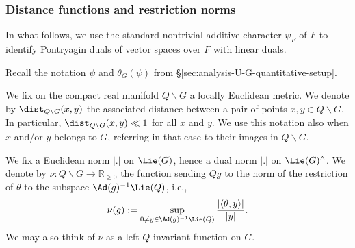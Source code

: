 \subsubsection{Distance functions and restriction norms}\label{sec:dist-funct-restr}
In what follows, we use the standard nontrivial additive character $\psi_F$ of $F$ to identify Pontryagin duals of vector spaces over $F$ with linear duals.

Recall the notation $\psi$ and $\theta_G(\psi)$ from \S\ref{sec:analysis-U-G-quantitative-setup}.

We fix on the compact real manifold $Q \backslash G$ a locally Euclidean metric.  We denote by $\dist_{Q \backslash G}(x,y)$ the associated distance between a pair of points $x, y \in Q \backslash G$.  In particular, $\dist_{Q \backslash G}(x,y) \ll 1$ for all $x$ and $y$.  We use this notation also when $x$ and/or $y$ belongs to $G$, referring in that case to their images in $Q \backslash G$.

We fix a Euclidean norm $|.|$ on $\Lie(G)$, hence a dual norm $|.|$ on $\Lie(G)^\wedge$.  We denote by $\nu : Q \backslash G \rightarrow \mathbb{R}_{\geq 0}$ the function sending $Q g$ to the norm of the restriction of $\theta$ to the subspace $\Ad(g)^{-1} \Lie(Q)$, i.e.,
\begin{equation*}
  \nu(g) := \sup_{0 \neq y \in \Ad(g)^{-1} \Lie(Q)}
  \frac{|\langle \theta, y \rangle|}{ |y|}.
\end{equation*}
We may also think of $\nu$ as a left-$Q$-invariant function on $G$.

